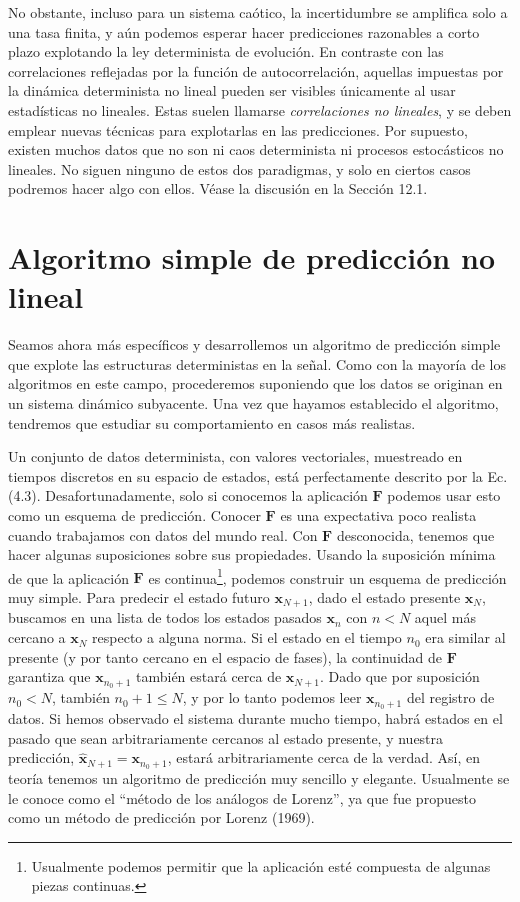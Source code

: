 \documentclass[10pt,a4paper]{book}
\begin{document}
\bigskip

No obstante, incluso para un sistema caótico, la incertidumbre se amplifica solo a una tasa finita, y aún podemos esperar hacer predicciones razonables a corto plazo explotando la ley determinista de evolución. En contraste con las correlaciones reflejadas por la función de autocorrelación, aquellas impuestas por la dinámica determinista no lineal pueden ser visibles únicamente al usar estadísticas no lineales. Estas suelen llamarse \textit{correlaciones no lineales}, y se deben emplear nuevas técnicas para explotarlas en las predicciones. Por supuesto, existen muchos datos que no son ni caos determinista ni procesos estocásticos no lineales. No siguen ninguno de estos dos paradigmas, y solo en ciertos casos podremos hacer algo con ellos. Véase la discusión en la Sección 12.1.

\section{Algoritmo simple de predicción no lineal}

Seamos ahora más específicos y desarrollemos un algoritmo de predicción simple que explote las estructuras deterministas en la señal. Como con la mayoría de los algoritmos en este campo, procederemos suponiendo que los datos se originan en un sistema dinámico subyacente. Una vez que hayamos establecido el algoritmo, tendremos que estudiar su comportamiento en casos más realistas.

Un conjunto de datos determinista, con valores vectoriales, muestreado en tiempos discretos en su espacio de estados, está perfectamente descrito por la Ec. (4.3). Desafortunadamente, solo si conocemos la aplicación $\mathbf{F}$ podemos usar esto como un esquema de predicción. Conocer $\mathbf{F}$ es una expectativa poco realista cuando trabajamos con datos del mundo real. Con $\mathbf{F}$ desconocida, tenemos que hacer algunas suposiciones sobre sus propiedades. Usando la suposición mínima de que la aplicación $\mathbf{F}$ es continua\footnote{Usualmente podemos permitir que la aplicación esté compuesta de algunas piezas continuas.}, podemos construir un esquema de predicción muy simple. Para predecir el estado futuro $\mathbf{x}_{N+1}$, dado el estado presente $\mathbf{x}_N$, buscamos en una lista de todos los estados pasados $\mathbf{x}_n$ con $n < N$ aquel más cercano a $\mathbf{x}_N$ respecto a alguna norma. Si el estado en el tiempo $n_0$ era similar al presente (y por tanto cercano en el espacio de fases), la continuidad de $\mathbf{F}$ garantiza que $\mathbf{x}_{n_0+1}$ también estará cerca de $\mathbf{x}_{N+1}$. Dado que por suposición $n_0 < N$, también $n_0 + 1 \leq N$, y por lo tanto podemos leer $\mathbf{x}_{n_0+1}$ del registro de datos. Si hemos observado el sistema durante mucho tiempo, habrá estados en el pasado que sean arbitrariamente cercanos al estado presente, y nuestra predicción, $\hat{\mathbf{x}}_{N+1} = \mathbf{x}_{n_0+1}$, estará arbitrariamente cerca de la verdad. Así, en teoría tenemos un algoritmo de predicción muy sencillo y elegante. Usualmente se le conoce como el “método de los análogos de Lorenz”, ya que fue propuesto como un método de predicción por Lorenz (1969).
\end{document}
